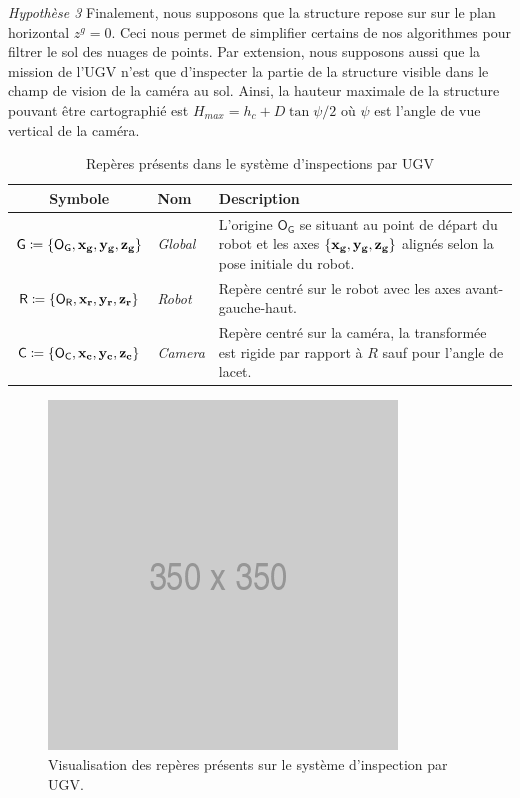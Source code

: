 \textit{Hypothèse 3} Finalement, nous supposons que la structure repose sur sur le plan horizontal $z^g = 0$. Ceci nous permet de simplifier certains de nos algorithmes pour filtrer le sol des nuages de points. Par extension, nous supposons aussi que la mission de l'UGV n'est que d'inspecter la partie de la structure visible dans le champ de vision de la caméra au sol. Ainsi, la hauteur maximale de la structure pouvant être cartographié est $H_{max} = h_c + D \tan{\psi/2}$ où $\psi$ est l'angle de vue vertical de la caméra.

\begin{table}[htp]
  \centering
  \setlength{\tabcolsep}{12pt}
  \begin{tabular}[htp]{|c|l|p{9cm}|}
    \hline
    Symbole & Nom                   & Description\\\hline
    $\mathsf{G} \coloneqq \{\mathsf{O_G}, \mathbf{x_g}, \mathbf{y_g}, \mathbf{z_g} \} $     &  \textit{Global}      & L'origine $\mathsf{O_G}$ se situant au point de départ du robot et les axes $\{\mathbf{x_g}, \mathbf{y_g}, \mathbf{z_g} \}$ alignés selon la pose initiale du robot.\\\hline
    $\mathsf{R} \coloneqq \{\mathsf{O_R}, \mathbf{x_r}, \mathbf{y_r}, \mathbf{z_r} \} $     &  \textit{Robot}       & Repère centré sur le robot avec les axes avant-gauche-haut.\\\hline
    $\mathsf{C} \coloneqq \{\mathsf{O_C}, \mathbf{x_c}, \mathbf{y_c}, \mathbf{z_c} \}$     &  \textit{Camera}      & Repère centré sur la caméra, la transformée est rigide par rapport à $R$ sauf pour l'angle de lacet. \\\hline
  \end{tabular}
  \setlength{\tabcolsep}{6pt}
  \caption{Repères présents dans le système d'inspections par UGV}
  \label{table:ugv_frames}
\end{table}

\begin{figure}[htp]
  \centering
  \includegraphics[width=0.3\linewidth]{images/placeholder.png}
  \caption{Visualisation des repères présents sur le système d'inspection par UGV.}
  \label{fig:ugv_frames}
\end{figure}

